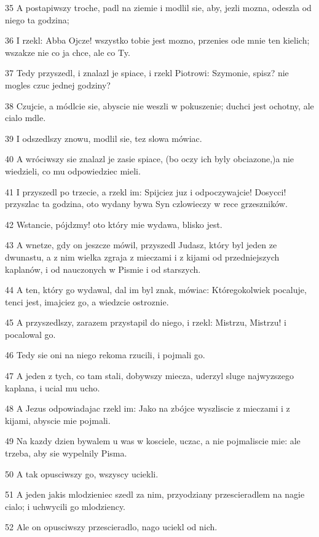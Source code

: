 \par 35 A postapiwszy troche, padl na ziemie i modlil sie, aby, jezli mozna, odeszla od niego ta godzina;
\par 36 I rzekl: Abba Ojcze! wszystko tobie jest mozno, przenies ode mnie ten kielich; wszakze nie co ja chce, ale co Ty.
\par 37 Tedy przyszedl, i znalazl je spiace, i rzekl Piotrowi: Szymonie, spisz? nie mogles czuc jednej godziny?
\par 38 Czujcie, a módlcie sie, abyscie nie weszli w pokuszenie; duchci jest ochotny, ale cialo mdle.
\par 39 I odszedlszy znowu, modlil sie, tez slowa mówiac.
\par 40 A wróciwszy sie znalazl je zasie spiace, (bo oczy ich byly obciazone,)a nie wiedzieli, co mu odpowiedziec mieli.
\par 41 I przyszedl po trzecie, a rzekl im: Spijciez juz i odpoczywajcie! Dosycci! przyszlac ta godzina, oto wydany bywa Syn czlowieczy w rece grzeszników.
\par 42 Wstancie, pójdzmy! oto który mie wydawa, blisko jest.
\par 43 A wnetze, gdy on jeszcze mówil, przyszedl Judasz, który byl jeden ze dwunastu, a z nim wielka zgraja z mieczami i z kijami od przedniejszych kaplanów, i od nauczonych w Pismie i od starszych.
\par 44 A ten, który go wydawal, dal im byl znak, mówiac: Któregokolwiek pocaluje, tenci jest, imajciez go, a wiedzcie ostroznie.
\par 45 A przyszedlszy, zarazem przystapil do niego, i rzekl: Mistrzu, Mistrzu! i pocalowal go.
\par 46 Tedy sie oni na niego rekoma rzucili, i pojmali go.
\par 47 A jeden z tych, co tam stali, dobywszy miecza, uderzyl sluge najwyzszego kaplana, i ucial mu ucho.
\par 48 A Jezus odpowiadajac rzekl im: Jako na zbójce wyszliscie z mieczami i z kijami, abyscie mie pojmali.
\par 49 Na kazdy dzien bywalem u was w kosciele, uczac, a nie pojmaliscie mie: ale trzeba, aby sie wypelnily Pisma.
\par 50 A tak opusciwszy go, wszyscy uciekli.
\par 51 A jeden jakis mlodzieniec szedl za nim, przyodziany przescieradlem na nagie cialo; i uchwycili go mlodziency.
\par 52 Ale on opusciwszy przescieradlo, nago uciekl od nich.
